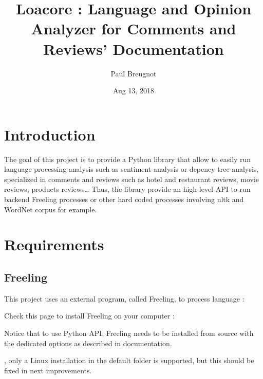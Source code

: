 \documentclass[letterpaper,10pt,english]{sphinxmanual}
\title{Loacore : Language and Opinion Analyzer for Comments and Reviews' Documentation}
\date{Aug 13, 2018}
\author{Paul Breugnot}
\begin{document}
\maketitle
\sphinxtableofcontents
{}\label{\detokenize{index::doc}}



\chapter{Introduction}
\label{\detokenize{introduction:introduction}}\label{\detokenize{introduction::doc}}

The goal of this project is to provide a Python library that allow to easily run language processing analysis such as sentiment analysis or depency tree analysis, specialized in comments and reviews such as hotel and restaurant reviews, movie reviews, products reviews… Thus, the library provide an high level API to run backend Freeling processes or other hard coded processes involving nltk and WordNet corpus for example.



\chapter{Requirements}
\label{\detokenize{requirements:requirements}}\label{\detokenize{requirements::doc}}

\section{Freeling}
\label{\detokenize{requirements:freeling}}
\begin{DUlineblock}{0em}
\item[] This project uses an external program, called Freeling, to process language : 
\item[] Check this page to install Freeling on your computer : 
\item[] Notice that to use Python API, Freeling needs to be installed from source with the dedicated options as described in documentation.
\item[] , only a Linux installation in the default folder  is supported, but this should be fixed in next improvements.
\end{DUlineblock}
\end{document}
